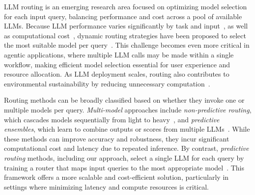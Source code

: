 \documentclass{article}
\theoremstyle{remark}
\begin{document}
LLM routing is an emerging research area focused on optimizing model selection for each input query, balancing performance and cost across a pool of available LLMs. Because LLM performance varies significantly by task and input~\citep{hu2024routerbench}, as well as computational cost~\citep{ong2406routellm}, dynamic routing strategies have been proposed to select the most suitable model per query~\citep{shnitzer2023large}. This challenge becomes even more critical in agentic applications, where multiple LLM calls may be made within a single workflow, making efficient model selection essential for user experience and resource allocation. As LLM deployment scales, routing also contributes to environmental sustainability by reducing unnecessary computation~\citep{singh2025survey}.




Routing methods can be broadly classified based on whether they invoke one or multiple models per query. \emph{Multi-model} approaches include \emph{non-predictive routing}, which cascades models sequentially from light to heavy~\citep{wang2023fusing, chen2023frugalgpt}, and \emph{predictive ensembles}, which learn to combine outputs or scores from multiple LLMs~\citep{shekhar2024towards, huang2025thriftllm}. While these methods can improve accuracy and robustness, they incur significant computational cost and latency due to repeated inference.
By contrast, \emph{predictive routing} methods, including our approach, select a single LLM for each query by training a router that maps input queries to the most appropriate model~\citep{shnitzer2023large, ong2406routellm, somerstep2025carrot}. This framework offers a more scalable and cost-efficient solution, particularly in settings where minimizing latency and compute resources is critical.
\end{document}
